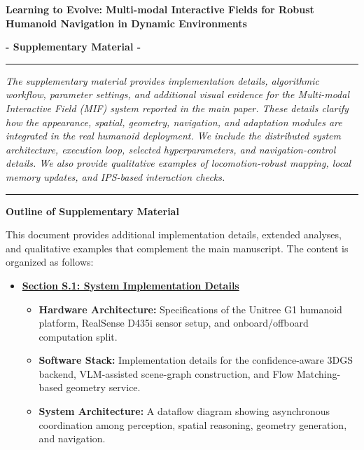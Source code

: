 \documentclass[conference]{IEEEtran}
\begin{document}
\begin{strip}
\begin{center}
\vspace{-5ex}
\textbf{\LARGE \bf
Learning to Evolve: Multi-modal Interactive Fields for Robust Humanoid Navigation in Dynamic Environments
} \\
\vspace{3ex}

\Large{\bf- Supplementary Material -}\\
\vspace{0.6cm}

\vspace{0.5cm}
\hrule
\vspace{0.3cm}

\begin{minipage}{0.96\textwidth}
\normalsize
\textit{
The supplementary material provides implementation details, algorithmic workflow, parameter settings, and additional visual evidence for the Multi-modal Interactive Field (MIF) system reported in the main paper.
These details clarify how the appearance, spatial, geometry, navigation, and adaptation modules are integrated in the real humanoid deployment.
We include the distributed system architecture, execution loop, selected hyperparameters, and navigation-control details.
We also provide qualitative examples of locomotion-robust mapping, local memory updates, and IPS-based interaction checks.
}
\end{minipage}

\vspace{0.5cm}
\hrule
\vspace{0.3cm}


\noindent\textbf{\large Outline of Supplementary Material}

\vspace{0.2cm}
\begin{minipage}{0.96\textwidth}
This document provides additional implementation details, extended analyses, and qualitative examples that complement the main manuscript. The content is organized as follows:

\begin{itemize} \setlength{\itemsep}{0.3em} \setlength{\parskip}{0pt} \setlength{\parsep}{0pt}
    \item \textbf{\hyperref[sec:implementation_details]{Section S.1: System Implementation Details}}
    \begin{itemize} \setlength{\itemsep}{1pt} \setlength{\topsep}{0pt} \small
        \item \textbf{Hardware Architecture:} Specifications of the Unitree G1 humanoid platform, RealSense D435i sensor setup, and onboard/offboard computation split.
        \item \textbf{Software Stack:} Implementation details for the confidence-aware 3DGS backend, VLM-assisted scene-graph construction, and Flow Matching-based geometry service.
        \item \textbf{System Architecture:} A dataflow diagram showing asynchronous coordination among perception, spatial reasoning, geometry generation, and navigation.
    \end{itemize}


\end{itemize}
\end{minipage}
\end{center}
\end{strip}
\end{document}
